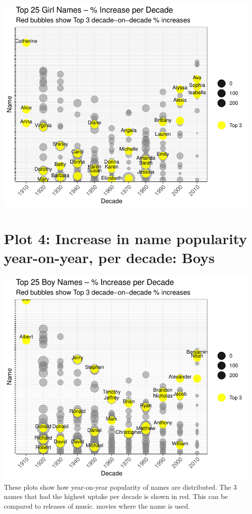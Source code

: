 \documentclass[11pt,preprint]{elsarticle}
\numberwithin{equation}{section}
\numberwithin{figure}{section}
\numberwithin{table}{section}
\begin{document}
\includegraphics{Question1_files/figure-latex/unnamed-chunk-3-1.pdf}

\section{Plot 4: Increase in name popularity year-on-year, per decade:
Boys}\label{plot-4-increase-in-name-popularity-year-on-year-per-decade-boys}

\includegraphics{Question1_files/figure-latex/unnamed-chunk-4-1.pdf}
These plots show how year-on-year popularity of names are distributed.
The 3 names that had the highest uptake per decade is shown in red. This
can be compared to releases of music. movies where the name is used.
\end{document}

